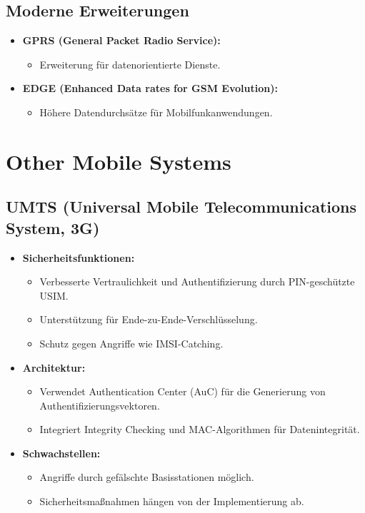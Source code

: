 \documentclass{article}
\begin{document}
\subsection{Moderne Erweiterungen}
\begin{itemize}
    \item \textbf{GPRS (General Packet Radio Service):}
    \begin{itemize}
        \item Erweiterung für datenorientierte Dienste.
    \end{itemize}
    \item \textbf{EDGE (Enhanced Data rates for GSM Evolution):}
    \begin{itemize}
        \item Höhere Datendurchsätze für Mobilfunkanwendungen.
    \end{itemize}
\end{itemize}


\section{Other Mobile Systems}

\subsection{UMTS (Universal Mobile Telecommunications System, 3G)}
\begin{itemize}
    \item \textbf{Sicherheitsfunktionen:}
    \begin{itemize}
        \item Verbesserte Vertraulichkeit und Authentifizierung durch PIN-geschützte USIM.
        \item Unterstützung für Ende-zu-Ende-Verschlüsselung.
        \item Schutz gegen Angriffe wie IMSI-Catching.
    \end{itemize}
    \item \textbf{Architektur:}
    \begin{itemize}
        \item Verwendet Authentication Center (AuC) für die Generierung von Authentifizierungsvektoren.
        \item Integriert Integrity Checking und MAC-Algorithmen für Datenintegrität.
    \end{itemize}
    \item \textbf{Schwachstellen:}
    \begin{itemize}
        \item Angriffe durch gefälschte Basisstationen möglich.
        \item Sicherheitsmaßnahmen hängen von der Implementierung ab.
    \end{itemize}
\end{itemize}
\end{document}
